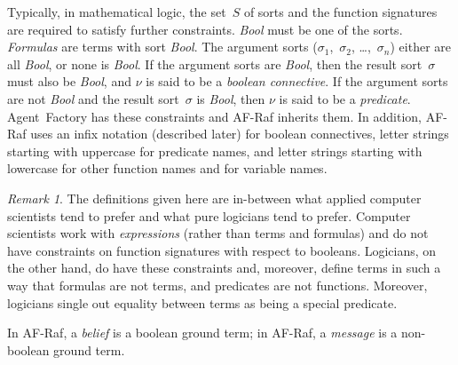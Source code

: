 \documentclass{aamas2012} %
\theoremstyle{remark}
\newtheorem{remark}{Remark}
\begin{document}
Typically, in mathematical logic, the set~$S$ of sorts and the function
signatures are required to satisfy further constraints. \textit{Bool} must
be one of the sorts. \emph{Formulas} are terms with sort \textit{Bool}.
The argument sorts ($\sigma_1$,~$\sigma_2$, \dots,~$\sigma_n$) either are
all \textit{Bool}, or none is \textit{Bool}.  If the argument sorts are
\textit{Bool}, then the result sort~$\sigma$ must also be \textit{Bool},
and $\nu$ is said to be a \emph{boolean connective}.  If the argument sorts
are not \textit{Bool} and the result sort~$\sigma$ is \textit{Bool}, then
$\nu$ is said to be a \emph{predicate}.  Agent~Factory has these
constraints and AF-Raf inherits them. In addition, AF-Raf uses an infix
notation (described later) for boolean connectives, letter strings starting
with uppercase for predicate names, and letter strings starting with
lowercase for other function names and for variable names.

\begin{remark}
The definitions given here are in-between what applied computer scientists
tend to prefer and what pure logicians tend to prefer.  Computer scientists
work with \emph{expressions} (rather than terms and formulas) and do not
have constraints on function signatures with respect to booleans.
Logicians, on the other hand, do have these constraints and, moreover,
define terms in such a way that formulas are not terms, and predicates are
not functions. Moreover, logicians single out equality between terms as
being a special predicate.
\end{remark}

In AF-Raf, a \emph{belief} is a boolean ground term; in AF-Raf, a
\emph{message} is a non-boolean ground term.
\end{document}
